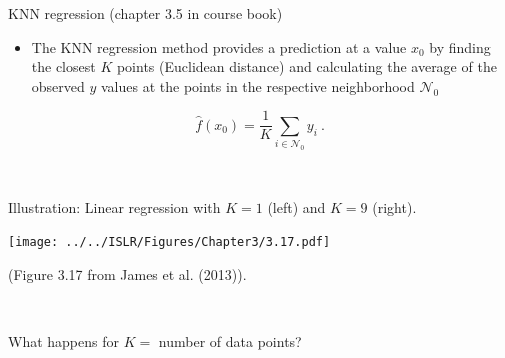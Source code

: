\documentclass[
  10pt,
  ignorenonframetext,
]{beamer}
\providecommand{\tightlist}{%
  \setlength{\itemsep}{0pt}\setlength{\parskip}{0pt}}
\begin{document}
\begin{frame}
\begin{block}{KNN regression (chapter 3.5 in course book)}
\protect\hypertarget{knn-regression-chapter-3.5-in-course-book}{}
\vspace{2mm}

\begin{itemize}
\tightlist
\item
  The KNN regression method provides a prediction at a value \(x_0\) by
  finding the closest \(K\) points (Euclidean distance) and calculating
  the average of the observed \(y\) values at the points in the
  respective neighborhood \(\mathcal{N}_0\)
\end{itemize}

\[\hat{f}(x_0)=\frac{1}{K}\sum_{i\in \mathcal{N}_0} y_i \ .\]

\(~\)

Illustration: Linear regression with \(K=1\) (left) and \(K=9\) (right).

\centering

\texttt{[image: ../../ISLR/Figures/Chapter3/3.17.pdf]}

\tiny

(Figure 3.17 from James et al. (2013)).

\(~\)

\normalsize
\flushleft

What happens for \(K=\) number of data points?
\end{block}
\end{frame}
\end{document}
